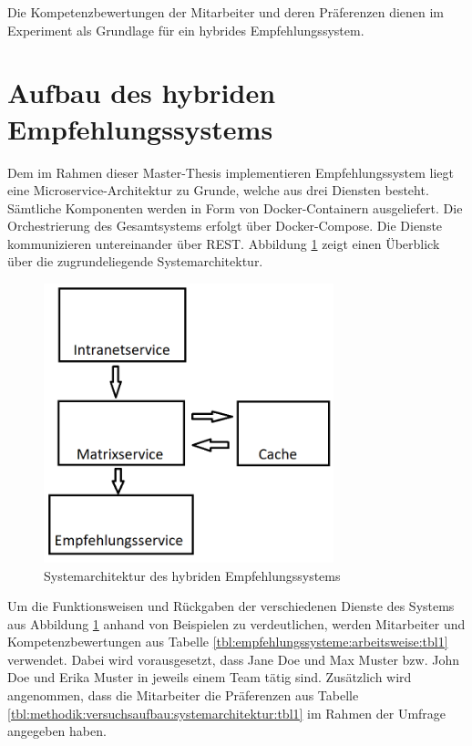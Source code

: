 Die Kompetenzbewertungen der Mitarbeiter und deren Präferenzen dienen im Experiment als Grundlage für ein hybrides Empfehlungssystem.

\section{Aufbau des hybriden Empfehlungssystems}
\label{ch:methodik:versuchsaufbau:systemarchitektur}
Dem im Rahmen dieser Master-Thesis implementieren Empfehlungssystem liegt eine Microservice-Architektur zu Grunde, welche aus drei Diensten besteht. Sämtliche Komponenten werden in Form von Docker-Containern ausgeliefert. Die Orchestrierung des Gesamtsystems erfolgt über Docker-Compose. Die Dienste kommunizieren untereinander über REST. Abbildung \ref{fig:methodik:systemarchitekturn:abb1} zeigt einen Überblick über die zugrundeliegende Systemarchitektur.

\begin{figure}[h]
	\centering
	\includegraphics[width=0.75\textwidth]{gfx/Systemarchitektur.png}
	\caption{Systemarchitektur des hybriden Empfehlungssystems}
	\label{fig:methodik:systemarchitekturn:abb1}
\end{figure}

Um die Funktionsweisen und Rückgaben der verschiedenen Dienste des Systems aus Abbildung \ref{fig:methodik:systemarchitekturn:abb1} anhand von Beispielen zu verdeutlichen, werden Mitarbeiter und Kompetenzbewertungen aus Tabelle \ref{tbl:empfehlungssysteme:arbeitsweise:tbl1} verwendet. Dabei wird vorausgesetzt, dass Jane Doe und Max Muster bzw. John Doe und Erika Muster in jeweils einem Team tätig sind. Zusätzlich wird angenommen, dass die Mitarbeiter die Präferenzen aus Tabelle \ref{tbl:methodik:versuchsaufbau:systemarchitektur:tbl1} im Rahmen der Umfrage angegeben haben.

